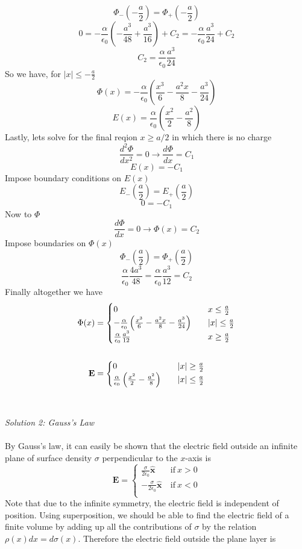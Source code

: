 \documentclass[11pt,letterpaper]{article}
\newcommand{\vect}[1]{\mathbf{#1}}
\begin{document}
\begin{enumerate}
$$\Phi_-(-\frac{a}{2}) = \Phi_+(-\frac{a}{2})$$
$$0 = -\frac{\alpha}{\epsilon_0}\left(-\frac{a^3}{48}+\frac{a^3}{16}\right)+C_2=-\frac{\alpha}{\epsilon_0}\frac{a^3}{24}+C_2$$
$$C_2 = \frac{\alpha}{\epsilon_0}\frac{a^3}{24}$$
So we have, for $|x|\leq-\frac{a}{2}$
$$\Phi(x) = -\frac{\alpha}{\epsilon_0}\left(\frac{x^3}{6}-\frac{a^2x}{8}-\frac{a^3}{24}\right)$$
$$E(x) = \frac{\alpha}{\epsilon_0}\left(\frac{x^2}{2}-\frac{a^2}{8}\right)$$
Lastly, lets solve for the final reqion $x\geq a/2$ in which there is no charge
$$\frac{d^2\Phi}{dx^2} = 0\rightarrow\frac{d\Phi}{dx} = C_1$$
$$E(x) = -C_1$$
Impose boundary conditions on $E(x)$
$$E_-(\frac{a}{2}) = E_+(\frac{a}{2})$$
$$0=-C_1$$
Now to $\Phi$
$$\frac{d\Phi}{dx} = 0\rightarrow\Phi(x) = C_2$$
Impose boundaries on $\Phi(x)$
$$\Phi_-(\frac{a}{2}) = \Phi_+(\frac{a}{2})$$
$$\frac{\alpha}{\epsilon_0}\frac{4a^3}{48} = \frac{\alpha}{\epsilon_0}\frac{a^3}{12} = C_2$$
Finally altogether we have
\begin{align*}\Phi(x) &=
\begin{cases}0\quad&x\leq\-\frac{a}{2}\\
-\frac{\alpha}{\epsilon_0}\left(\frac{x^3}{6}-\frac{a^2x}{8}-\frac{a^3}{24}\right)\quad&|x|\leq\frac{a}{2}\\
\frac{\alpha}{\epsilon_0}\frac{a^3}{12}\quad&x\geq\frac{a}{2}
\end{cases} \\
\\\vect E&=\begin{cases}0\quad&|x|\geq\frac{a}{2}\\
\frac{\alpha}{\epsilon_0}\left(\frac{x^2}{2}-\frac{a^2}{8}\right)\quad&|x|\leq\frac{a}{2}
\end{cases}
\end{align*}
\\ \\ \emph{Solution 2: Gauss's Law}\\ \\By Gauss's law, it can easily be shown that the electric field outside an infinite plane of surface density $\sigma$ perpendicular to the $x$-axis is 
$$\vect E =\begin{cases}
 \frac{\sigma}{2\epsilon_0}\hat{\vect x}&\ \text{if}\ x>0\\
  -\frac{\sigma}{2\epsilon_0}\hat{\vect x}&\ \text{if}\ x<0\\
 \end{cases}$$
Note that due to the infinite symmetry, the electric field is independent of position. Using superposition, we should be able to find the electric field of a finite volume by adding up all the contributions of $\sigma$ by the relation $\rho(x)dx = d\sigma(x)$. Therefore the electric field outside the plane layer is 

\end{enumerate}
\end{document}
